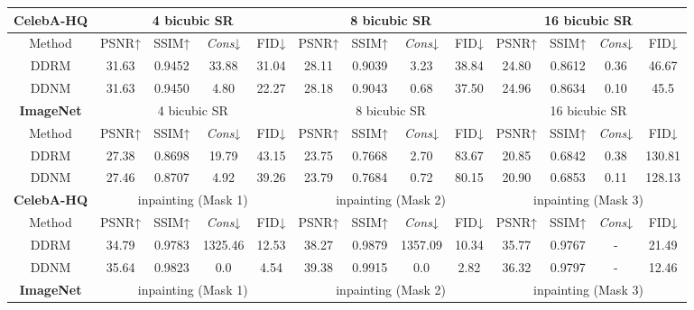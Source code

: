 \documentclass{article} \usepackage{iclr2023_conference,times}
\begin{document}
\begin{table*}[h]
\scriptsize
    \begin{tabular}{c | cccc | cccc| cccc}
        \hline
           \multicolumn{1}{c}{\rule{0pt}{10pt}\tiny\textbf{CelebA-HQ}}&\multicolumn{4}{c}{4 bicubic SR} &\multicolumn{4}{c}{8 bicubic SR}&\multicolumn{4}{c}{16 bicubic SR}\\
        \hline
           \rule{0pt}{10pt}Method& PSNR↑&SSIM↑& \textit{Cons}↓&FID↓ &  PSNR↑&SSIM↑&  \textit{Cons}↓ &FID↓ &  PSNR↑&SSIM↑& \textit{Cons}↓&FID↓ \\
        \hline
            \rule{0pt}{10pt}{DDRM} &31.63&0.9452&33.88&31.04 & 28.11&0.9039&3.23&38.84 & 24.80&0.8612&0.36&46.67\\
            \rule{0pt}{10pt}{DDNM} &31.63&0.9450&4.80&22.27 & 28.18&0.9043&0.68&37.50 & 24.96&0.8634&0.10&45.5\\
        \hline
        \hline
           \multicolumn{1}{c}{\rule{0pt}{10pt}\tiny\textbf{ImageNet}}&\multicolumn{4}{c}{4 bicubic SR} &\multicolumn{4}{c}{8 bicubic SR}&\multicolumn{4}{c}{16 bicubic SR}\\
        \hline
           \rule{0pt}{10pt}Method& PSNR↑&SSIM↑& \textit{Cons}↓&FID↓ &  PSNR↑&SSIM↑&  \textit{Cons}↓ &FID↓ &  PSNR↑&SSIM↑& \textit{Cons}↓&FID↓ \\
        \hline
             \rule{0pt}{10pt}{DDRM} &27.38&0.8698&19.79&43.15&23.75&0.7668&2.70&83.67&20.85&0.6842&0.38&130.81\\
            \rule{0pt}{10pt}{DDNM}& 27.46&0.8707&4.92&39.26 & 23.79&0.7684&0.72&80.15 & 20.90&0.6853&0.11&128.13\\
        \hline
        \hline
            \multicolumn{1}{c}{\rule{0pt}{10pt}\tiny\textbf{CelebA-HQ}}&\multicolumn{4}{c}{inpainting (Mask 1)} &\multicolumn{4}{c}{inpainting (Mask 2)}&\multicolumn{4}{c}{inpainting (Mask 3)}\\
        \hline
           \rule{0pt}{10pt}Method& PSNR↑&SSIM↑& \textit{Cons}↓&FID↓ &  PSNR↑&SSIM↑&  \textit{Cons}↓ &FID↓ &  PSNR↑&SSIM↑& \textit{Cons}↓&FID↓ \\
        \hline
\rule{0pt}{10pt}{DDRM} &34.79&0.9783&1325.46&12.53 & 38.27&0.9879&1357.09&10.34 & 35.77&0.9767&-&21.49\\
            \rule{0pt}{10pt}{DDNM} &35.64&0.9823&0.0&4.54 & 39.38&0.9915&0.0&2.82 & 36.32&0.9797&-&12.46\\
        \hline
        \hline
           \multicolumn{1}{c}{\rule{0pt}{10pt}\tiny\textbf{ImageNet}}&\multicolumn{4}{c}{inpainting (Mask 1)} &\multicolumn{4}{c}{inpainting (Mask 2)}&\multicolumn{4}{c}{inpainting (Mask 3)}\\

\end{tabular}
\end{table*}
\end{document}

